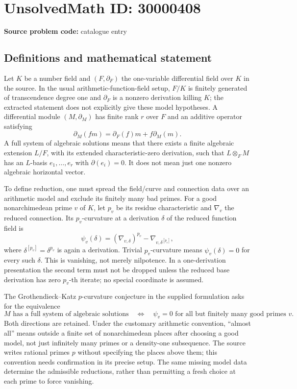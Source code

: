 \documentclass[11pt]{article}
\begin{document}
\section*{UnsolvedMath ID: 30000408}
\textbf{Source problem code:} catalogue entry
\subsection{Definitions and mathematical statement}
Let \(K\) be a number field and \((F,\partial_F)\) the one-variable differential field over \(K\) in the source. In the usual arithmetic-function-field setup, \(F/K\) is finitely generated of transcendence degree one and \(\partial_F\) is a nonzero derivation killing \(K\); the extracted statement does not explicitly give these model hypotheses. A differential module \((M,\partial_M)\) has finite rank \(r\) over \(F\) and an additive operator satisfying
\[
 \partial_M(fm)=\partial_F(f)m+f\partial_M(m).
\]
A full system of algebraic solutions means that there exists a finite algebraic extension \(L/F\), with its extended characteristic-zero derivation, such that \(L\otimes_F M\) has an \(L\)-basis \(e_1,\ldots,e_r\) with \(\partial(e_i)=0\). It does not mean just one nonzero algebraic horizontal vector.

To define reduction, one must spread the field/curve and connection data over an arithmetic model and exclude its finitely many bad primes. For a good nonarchimedean prime \(v\) of \(K\), let \(p_v\) be its residue characteristic and \(\nabla_v\) the reduced connection. Its \(p_v\)-curvature at a derivation \(\delta\) of the reduced function field is
\[
 \psi_v(\delta)=(\nabla_{v,\delta})^{p_v}-\nabla_{v,\delta^{[p_v]}},
\]
where \(\delta^{[p_v]}=\delta^{p_v}\) is again a derivation. Trivial \(p_v\)-curvature means \(\psi_v(\delta)=0\) for every such \(\delta\). This is vanishing, not merely nilpotence. In a one-derivation presentation the second term must not be dropped unless the reduced base derivation has zero \(p_v\)-th iterate; no special coordinate is assumed.

The Grothendieck--Katz \(p\)-curvature conjecture in the supplied formulation asks for the equivalence
\[
 M\text{ has a full system of algebraic solutions}
 \quad\Longleftrightarrow\quad
 \psi_v=0\text{ for all but finitely many good primes }v.
\]
Both directions are retained. Under the customary arithmetic convention, ``almost all'' means outside a finite set of nonarchimedean places after choosing a good model, not just infinitely many primes or a density-one subsequence. The source writes rational primes \(p\) without specifying the places above them; this convention needs confirmation in its precise setup. The same missing model data determine the admissible reductions, rather than permitting a fresh choice at each prime to force vanishing.
\end{document}
